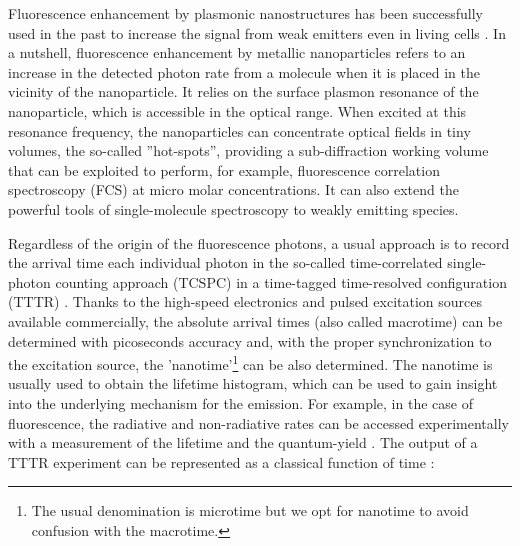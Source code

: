 %

Fluorescence enhancement by plasmonic nanostructures has been successfully 
used in the past to increase the signal from weak 
emitters\cite{kinkhabwala2009large, yuan2013thousandfold, khatua2014resonant} even in 
living cells \cite{vanzanten2010imaging}. In a nutshell, fluorescence enhancement
by metallic nanoparticles refers to an increase in the detected 
photon rate from a molecule when it is placed in the vicinity of the nanoparticle.
It relies on the surface plasmon resonance of the nanoparticle, which is accessible
in the optical range. When excited at this resonance frequency, 
the nanoparticles can concentrate optical fields in tiny volumes,
the so-called ''hot-spots'', providing a sub-diffraction 
working volume that can be exploited to perform, for example, 
fluorescence correlation spectroscopy (FCS) at micro molar 
concentrations\cite{estrada2008,manzo2011nanoscale,punj2013gold,khatua2014enhancedfluorescence}.
It can also extend the powerful tools of single-molecule spectroscopy to 
weakly emitting species.


Regardless of the origin of the fluorescence photons, a usual approach is to record the arrival time each individual 
photon in the so-called time-correlated single-photon counting approach (TCSPC) in a time-tagged 
time-resolved configuration (TTTR) \cite{Wahl_picoquant}. 
Thanks to the high-speed electronics and pulsed excitation sources available commercially, 
the absolute arrival times (also called macrotime) can be determined with picoseconds accuracy and, with the proper synchronization to the excitation source, the 'nanotime'\footnote{The usual denomination is microtime but we opt for nanotime to avoid confusion with the macrotime.} can be also determined. 
The nanotime is usually used to obtain the lifetime histogram, which can be used to 
gain insight into the underlying mechanism for the emission. For example, 
in the case of fluorescence, the radiative and non-radiative rates can be accessed experimentally with a 
measurement of the lifetime and the quantum-yield \cite{lakowicz2007principles}.
The output of a TTTR experiment can be represented as a classical function of time \cite{Lippitz2005}:

